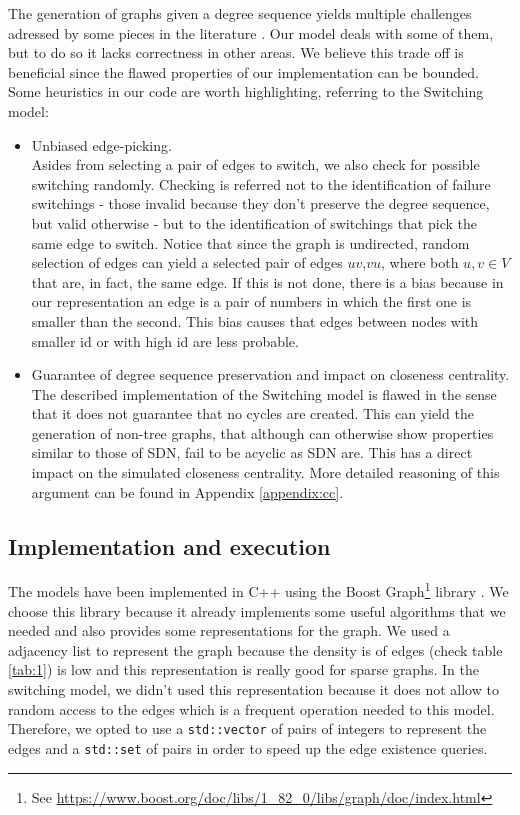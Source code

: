 The generation of graphs given a degree sequence yields multiple challenges adressed by some pieces in the literature \cite{blitzstein2011sequential, coolen2009constrained, milo2003uniform}. Our model deals with some of them, but to do so it lacks correctness in other areas. We believe this trade off is beneficial since the flawed properties of our implementation can be bounded. Some heuristics in our code are worth highlighting, referring to the Switching model:
\begin{itemize}
    \item Unbiased edge-picking. \\
    Asides from selecting a pair of edges to switch, we also check for possible switching randomly. Checking is referred not to the identification of failure switchings - those invalid because they don't preserve the degree sequence, but valid otherwise - but to the identification of switchings that pick the same edge to switch. Notice that since the graph is undirected, random selection of edges can yield a selected pair of edges $uv$,$vu$, where both $u,v\in V$ that are, in fact, the same edge. If this is not done, there is a bias because in our representation an edge is a pair of numbers in which the first one is smaller than the second. This bias causes that edges between nodes with smaller id or with high id are less probable.

    \item Guarantee of degree sequence preservation and impact on closeness centrality.\\
    The described implementation of the Switching model is flawed in the sense that it does not guarantee that no cycles are created. This can yield the generation of non-tree graphs, that although can otherwise show properties similar to those of SDN, fail to be acyclic as SDN are. This has a direct impact on the simulated closeness centrality. More detailed reasoning of this argument can be found in Appendix \ref{appendix:cc}.
\end{itemize}

\subsection{Implementation and execution}
The models have been implemented in C++ using the Boost Graph\footnote{See \url{https://www.boost.org/doc/libs/1_82_0/libs/graph/doc/index.html}} library \cite{siek2001boost}. We choose this library because it already implements some useful algorithms that we needed and also provides some representations for the graph. We used a adjacency list to represent the graph because the density is of edges (check table \ref{tab:1}) is low and this representation is really good for sparse graphs. In the switching model, we didn't used this representation because it does not allow to random access to the edges which is a frequent operation needed to this model. Therefore, we opted to use a \verb|std::vector| of pairs of integers to represent the edges and a \verb|std::set| of pairs in order to speed up the edge existence queries. 

